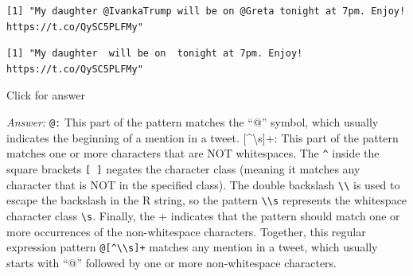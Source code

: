 \documentclass[
]{book}
\newenvironment{Shaded}{\begin{snugshade}}{\end{snugshade}}
\newcommand{\AttributeTok}[1]{\textcolor[rgb]{0.13,0.29,0.53}{#1}}
\newcommand{\DecValTok}[1]{\textcolor[rgb]{0.00,0.00,0.81}{#1}}
\newcommand{\FunctionTok}[1]{\textcolor[rgb]{0.13,0.29,0.53}{\textbf{#1}}}
\newcommand{\NormalTok}[1]{#1}
\newcommand{\OtherTok}[1]{\textcolor[rgb]{0.56,0.35,0.01}{#1}}
\newcommand{\SpecialCharTok}[1]{\textcolor[rgb]{0.81,0.36,0.00}{\textbf{#1}}}
\newcommand{\StringTok}[1]{\textcolor[rgb]{0.31,0.60,0.02}{#1}}
\begin{document}
\begin{Shaded}
\end{Shaded}

\begin{verbatim}
[1] "My daughter @IvankaTrump will be on @Greta tonight at 7pm. Enjoy! https://t.co/QySC5PLFMy"
\end{verbatim}

\begin{Shaded}
\end{Shaded}

\begin{verbatim}
[1] "My daughter  will be on  tonight at 7pm. Enjoy! https://t.co/QySC5PLFMy"
\end{verbatim}

Click for answer

\emph{Answer:} \texttt{@:} This part of the pattern matches the ``@'' symbol, which usually indicates the beginning of a mention in a tweet.
{[}\^{}\textbackslash s{]}+: This part of the pattern matches one or more characters that are NOT whitespaces. The \texttt{\^{}} inside the square brackets \texttt{{[}\ {]}} negates the character class (meaning it matches any character that is NOT in the specified class). The double backslash \texttt{\textbackslash{}\textbackslash{}} is used to escape the backslash in the R string, so the pattern \texttt{\textbackslash{}\textbackslash{}s} represents the whitespace character class \texttt{\textbackslash{}s}. Finally, the + indicates that the pattern should match one or more occurrences of the non-whitespace characters. Together, this regular expression pattern \texttt{@{[}\^{}\textbackslash{}\textbackslash{}s{]}+} matches any mention in a tweet, which usually starts with ``@'' followed by one or more non-whitespace characters.
\end{document}
